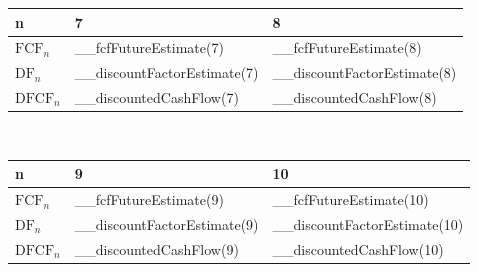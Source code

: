 \begin{enumerate}
\begin{tabularx}{\textwidth}{|X|X|X|}
 \hline
 n & 7 & 8 \\
 \hline
 $\text{FCF}_n$                       & __fcfFutureEstimate(7)      & __fcfFutureEstimate(8)      \\
 $\text{DF}_n$                        & __discountFactorEstimate(7) & __discountFactorEstimate(8) \\
 \rowcolor{lightgray} $\text{DFCF}_n$ & __discountedCashFlow(7)     & __discountedCashFlow(8)     \\
 \hline
\end{tabularx}\\

\begin{tabularx}{\textwidth}{|X|X|X|}
 \hline
 n & 9 & 10 \\
 \hline
 $\text{FCF}_n$                       & __fcfFutureEstimate(9)      & __fcfFutureEstimate(10)      \\
 $\text{DF}_n$                        & __discountFactorEstimate(9) & __discountFactorEstimate(10) \\
 \rowcolor{lightgray} $\text{DFCF}_n$ & __discountedCashFlow(9)     & __discountedCashFlow(10)     \\
 \hline
\end{tabularx}\\


\end{enumerate}
